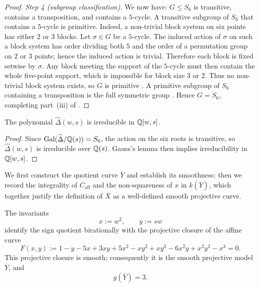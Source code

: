 \begin{proof}
\medskip
\noindent\textit{Step 4 (subgroup classification).}\quad
We now have: \(G\le S_6\) is transitive, contains a transposition, and
contains a \(5\)-cycle. A transitive subgroup of \(S_6\) that contains
a \(5\)-cycle is primitive. Indeed, a non-trivial block system on six
points has either \(2\) or \(3\) blocks. Let \(\sigma\in G\) be a
\(5\)-cycle. The induced action of \(\sigma\) on such a block system
has order dividing both \(5\) and the order of a permutation group on
\(2\) or \(3\) points; hence the induced action is trivial. Therefore
each block is fixed setwise by \(\sigma\). Any block meeting the support
of the \(5\)-cycle must then contain the whole five-point support,
which is impossible for block size \(3\) or \(2\). Thus no non-trivial
block system exists, so \(G\) is primitive
\cite[Ch.~3, \S{}3.3]{Dixon1996}.
A primitive subgroup of \(S_6\) containing a transposition is the full
symmetric group \cite[Ch.~3, Theorem~3.3A]{Dixon1996}. Hence \(G=S_6\),
completing part~\textup{(iii)} of .

\end{proof}

\begin{corollary}\label{lem:hatdelta-irreducible}
The polynomial \(\widehat\Delta(w,s)\) is irreducible in \(\mathbb{Q}[w,s]\).
\end{corollary}

\begin{proof}
Since \(\operatorname{Gal}(\widehat\Delta/\mathbb{Q}(s))=S_6\), the action on the six roots is
transitive, so \(\widehat\Delta(w,s)\) is irreducible over \(\mathbb{Q}(s)\).
Gauss's lemma then implies irreducibility in \(\mathbb{Q}[w,s]\).
\end{proof}
We first construct the quotient curve \(\overline{Y}\) and establish its
smoothness; then we record the integrality of \(C_{\mathrm{aff}}\) and
the non-squareness of \(x\) in \(k(\overline{Y})\), which together
justify the definition of \(\overline{X}\) as a well-defined smooth
projective curve.

\begin{proposition}
  \label{prop:sync-hatdelta-quotient}
  The invariants
  \[
    x:=w^2,\qquad y:=sw
  \]
  identify the sign quotient birationally with the projective closure of
  the affine curve
  \[
    F(x,y):=
    1-y-5x+3xy+5x^2-xy^2+xy^3-6x^2y+x^2y^2-x^3=0.
  \]
  This projective closure is smooth; consequently it is the smooth
  projective model \(\overline{Y}\), and
  \[
    g(\overline{Y})=3.
  \]
\end{proposition}

